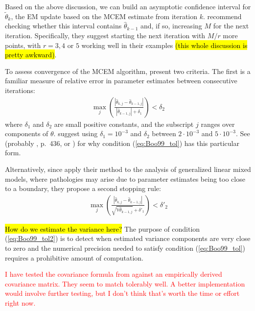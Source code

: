\documentclass[11pt, oneside]{article}   	%
\newcommand{\bV}{\mathbb{V}}
\begin{document}
Based on the above discussion, we can build an asymptotic confidence interval for $\tilde{\theta}_k$, the EM update based on the MCEM estimate from iteration $k$. \citeauthor{Boo99} recommend checking whether this interval contains $\hat{\theta}_{k-1}$ and, if so, increasing $M$ for the next iteration. Specifically, they suggest starting the next iteration with $M/r$ more points, with $r = 3,4$ or $5$ working well in their examples \hl{(this whole discussion is pretty awkward)}.

To assess convergence of the MCEM algorithm, \citeauthor{Boo99} present two criteria. The first is a familiar measure of relative error in parameter estimates between consecutive iterations:
%
\begin{align}
    \max_j \left( \frac{\left| \hat{\theta}_{k, j} - \hat{\theta}_{k-1,j} \right|}{\left| \hat{\theta}_{k-1,j} \right| + \delta_1} \right) < \delta_2 \label{eq:Boo99_tol}
\end{align}
%
where $\delta_1$ and $\delta_2$ are small positive constants, and the subscript $j$ ranges over components of $\theta$. \citeauthor{Boo99} suggest using $\delta_1 = 10^{-3}$ and $\delta_2$ between $2 \cdot 10^{-3}$ and $5 \cdot 10^{-3}$. See \citep{need} (probably \citealp{Sea06}, p.\ 436, or \citealp{Mar63}) for why condition (\ref{eq:Boo99_tol}) has this particular form.

Alternatively, since \citeauthor{Boo99} apply their method to the analysis of generalized linear mixed models, where pathologies may arise due to parameter estimates being too close to a boundary, they propose a second stopping rule:
%
\begin{align}
    \max_j \left( \frac{\left| \hat{\theta}_{k, j} - \hat{\theta}_{k-1,j} \right|}{\sqrt{\bV \hat{\theta}_{k-1,j}} + \delta'_1} \right) < \delta'_2 \label{eq:Boo99_tol2}
\end{align}

\hl{How do we estimate the variance here?} The purpose of condition (\ref{eq:Boo99_tol2}) is to detect when estimated variance components are very close to zero and the numerical precision needed to satisfy condition (\ref{eq:Boo99_tol}) requires a prohibitive amount of computation.


\textcolor{red}{I have tested the covariance formula from \citet{Boo99} against an empirically derived covariance matrix. They seem to match tolerably well. A better implementation would involve further testing, but I don't think that's worth the time or effort right now.}
\end{document}
